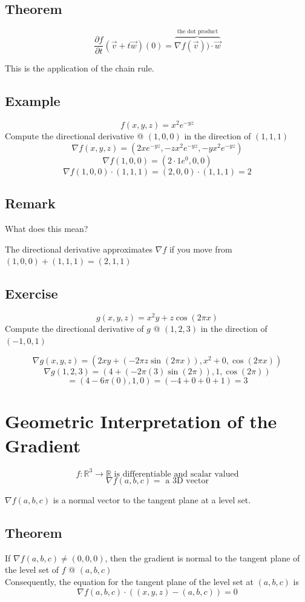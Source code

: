 \documentclass{article}
\begin{document}
\subsection*{Theorem}
\[\frac{\partial f}{\partial t}(\vec{v}+t\vec{w})(0) = \overbrace{\nabla f(\vec{v})) \cdot \vec{w}}^{\mbox{the dot product}}\]
\begin{center}
    This is the application of the chain rule. 
\end{center}
\subsection*{Example}
\[f(x,y,z)=x^2 e^{-yz}\]
Compute the directional derivative @ $(1,0,0)$ in the direction of $(1,1,1)$
\[\nabla f(x,y,z)=(2xe^{-yz},-zx^2 e^{-yz},-yx^2 e^{-yz})\]
\[\nabla f(1,0,0)=(2\cdot 1e^0 ,0,0)\]
\[\nabla f(1,0,0)\cdot  (1,1,1)=(2,0,0)\cdot (1,1,1)=2\]
\subsection*{Remark}
What does this mean?

The directional derivative approximates $\nabla f$ if you move from $(1,0,0)+(1,1,1)=(2,1,1)$

\subsection*{Exercise}
\[g(x,y,z)=x^{2}y+z\cos(2\pi x)\]
Compute the directional derivative of $g$ @ $(1,2,3)$ in the direction of $(-1,0,1)$

\[\nabla g(x,y,z) = (2xy+(-2\pi z\sin(2\pi x)),x^2+0,\cos(2\pi x))\]
\[\nabla g(1,2,3)= (4+(-2\pi (3)\sin(2\pi)), 1, \cos(2\pi))\]
\[=(4-6\pi (0),1,0)=(-4+0+0+1)=3\]

\section{Geometric Interpretation of the Gradient}
\[f:\mathbb{R}^3\rightarrow\mathbb{R} \mbox{ is differentiable and scalar valued}\]
\[\nabla f(a,b,c) = \mbox{ a 3D vector}\]

$\nabla f(a,b,c)$ is a normal vector to the tangent plane at a level set. 

\subsection*{Theorem}
If $\nabla f(a,b,c)\neq (0,0,0)$, then the gradient is normal to the tangent plane of the level set of $f$ @ $(a,b,c)$\\
Consequently, the equation for the tangent plane of the level set at $(a,b,c)$ is 
\[\nabla f(a,b,c)\cdot ((x,y,z)-(a,b,c))=0\]
\end{document}
